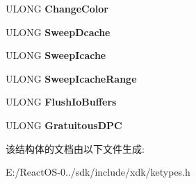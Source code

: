 \begin{DoxyCompactItemize}
\mbox{\label{struct___k_i_p_i___c_o_u_n_t_s_a718f5e48cb407cdbe020658cf480dbb2}} 
U\+L\+O\+NG {\bfseries Change\+Color}
\item 
\mbox{\label{struct___k_i_p_i___c_o_u_n_t_s_ac9acfeeb5ac1ac6bd4a7f0c229bf97eb}} 
U\+L\+O\+NG {\bfseries Sweep\+Dcache}
\item 
\mbox{\label{struct___k_i_p_i___c_o_u_n_t_s_a4062161fa50d08f1e71e2afe1c7c5de5}} 
U\+L\+O\+NG {\bfseries Sweep\+Icache}
\item 
\mbox{\label{struct___k_i_p_i___c_o_u_n_t_s_a4565e998ae417c6209d9350242467051}} 
U\+L\+O\+NG {\bfseries Sweep\+Icache\+Range}
\item 
\mbox{\label{struct___k_i_p_i___c_o_u_n_t_s_a32b68617221af7cd077f067d008cb5b8}} 
U\+L\+O\+NG {\bfseries Flush\+Io\+Buffers}
\item 
\mbox{\label{struct___k_i_p_i___c_o_u_n_t_s_af4bbf226426c11a6354a253f9c2605cc}} 
U\+L\+O\+NG {\bfseries Gratuitous\+D\+PC}
\end{DoxyCompactItemize}


该结构体的文档由以下文件生成\+:\begin{DoxyCompactItemize}
\item 
E\+:/\+React\+O\+S-\/0../sdk/include/xdk/ketypes.\+h\end{DoxyCompactItemize}
